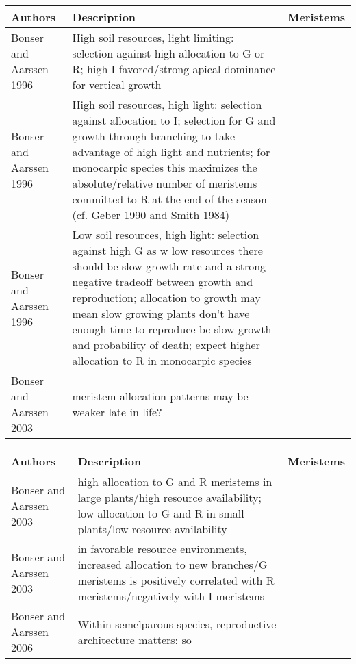\documentclass[12pt, oneside]{article}   	%
\begin{document}
 \begin{tabularx}{\textwidth}{|l| >{\setlength{\baselineskip}{.5\baselineskip}}X|l|}
\hline
Authors & Description & Meristems \\ \hline
 \cite{} Bonser and Aarssen 1996     & High soil resources, light limiting: selection against high allocation to G or R; high I favored/strong apical dominance for vertical growth   &           \\ \hline
 \cite{} Bonser and Aarssen 1996     & High soil resources, high light: selection against allocation to I; selection for G and growth through branching to take advantage of high light and nutrients; for monocarpic species this maximizes the absolute/relative number of meristems committed to R at the end of the season (cf. Geber 1990 and Smith 1984)   &           \\ \hline
 \cite{} Bonser and Aarssen 1996     & Low soil resources, high light: selection against high G as w low resources there should be slow growth rate and a strong negative tradeoff between growth and reproduction; allocation to growth may mean slow growing plants don't have enough time to reproduce bc slow growth and probability of death; expect higher allocation to R in monocarpic species &           \\ \hline
    \cite{} Bonser and Aarssen 2003   & meristem allocation patterns may be weaker late in life? &           \\ \hline
 \end{tabularx}
 
  \begin{tabularx}{\textwidth}{|l| >{\setlength{\baselineskip}{.5\baselineskip}}X|l|}
\hline
Authors & Description & Meristems \\ \hline
 \cite{} Bonser and Aarssen 2003   & high allocation to G and R meristems in large plants/high resource availability; low allocation to G and R in small plants/low resource availability &           \\ \hline
\cite{} Bonser and Aarssen 2003   & in favorable resource environments, increased allocation to new branches/G meristems is positively correlated with R meristems/negatively with I meristems &           \\ \hline
 \cite{}  Bonser and Aarssen 2006      & Within semelparous species, reproductive architecture matters: so  &           \\ \hline
 \end{tabularx}
 
\end{document}
